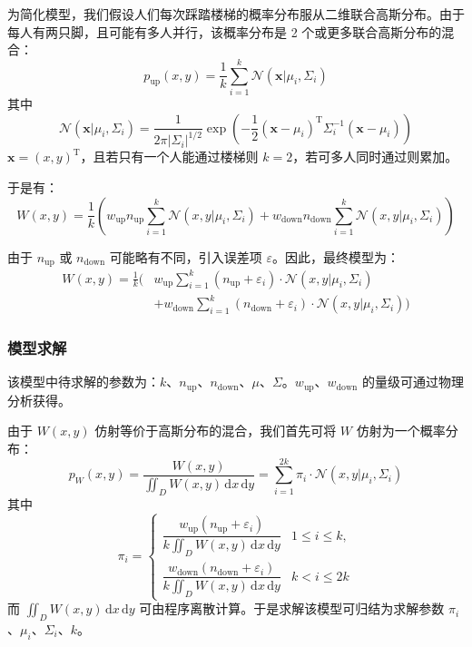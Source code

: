 \documentclass[11pt,a4paper]{ctexart}
\newcommand{\cfgup}{\mathrm{up}}
\newcommand{\cfgdown}{\mathrm{down}}
\begin{document}
为简化模型，我们假设人们每次踩踏楼梯的概率分布服从二维联合高斯分布。由于每人有两只脚，且可能有多人并行，该概率分布是 2 个或更多联合高斯分布的混合：
\begin{equation}
p_{\cfgup}(x,y) = \frac{1}{k}\sum_{i=1}^{k}\mathcal{N}(\mathbf{x}|\mu_i,\Sigma_i)
\end{equation}
其中
\begin{equation}
\mathcal{N}(\mathbf{x}|\mu_i,\Sigma_i) = \frac{1}{2\pi|\Sigma_i|^{1/2}}\exp\left(-\frac{1}{2}(\mathbf{x}-\mu_i)^{\mathrm{T}}\Sigma_i^{-1}(\mathbf{x}-\mu_i)\right)
\end{equation}
$\mathbf{x} = (x,y)^{\mathrm{T}}$，且若只有一个人能通过楼梯则 $k=2$，若可多人同时通过则累加。

于是有：
\begin{equation}
W(x,y) = \frac{1}{k}\left(w_{\cfgup}n_{\cfgup}\sum_{i=1}^{k}\mathcal{N}(x,y|\mu_i,\Sigma_i) + w_{\cfgdown}n_{\cfgdown}\sum_{i=1}^{k}\mathcal{N}(x,y|\mu_i,\Sigma_i)\right)
\end{equation}

由于 $n_{\cfgup}$ 或 $n_{\cfgdown}$ 可能略有不同，引入误差项 $\varepsilon$。因此，最终模型为：
\begin{equation}
\begin{aligned}
W(x,y) = \frac{1}{k}\Bigg(& w_{\cfgup}\sum_{i=1}^{k}(n_{\cfgup}+\varepsilon_i)\cdot\mathcal{N}(x,y|\mu_i,\Sigma_i)\\
&+ w_{\cfgdown}\sum_{i=1}^{k}(n_{\cfgdown}+\varepsilon_i)\cdot\mathcal{N}(x,y|\mu_i,\Sigma_i)\Bigg)
\end{aligned}
\end{equation}

\subsubsection{模型求解}

该模型中待求解的参数为：$k$、$n_{\cfgup}$、$n_{\cfgdown}$、$\mu$、$\Sigma$。$w_{\cfgup}$、$w_{\cfgdown}$ 的量级可通过物理分析获得。

由于 $W(x,y)$ 仿射等价于高斯分布的混合，我们首先可将 $W$ 仿射为一个概率分布：
\begin{equation}
p_W(x,y) = \frac{W(x,y)}{\displaystyle\iint_{D} W(x,y)\,\mathrm{d}x\,\mathrm{d}y} = \sum_{i=1}^{2k}\pi_i\cdot\mathcal{N}(x,y|\mu_i,\Sigma_i)
\end{equation}
其中
\begin{equation}
\pi_i =
\begin{cases}
\dfrac{w_{\cfgup}(n_{\cfgup}+\varepsilon_i)}{k\displaystyle\iint_{D} W(x,y)\,\mathrm{d}x\,\mathrm{d}y} & 1\le i\le k,\\[2.2em]
\dfrac{w_{\cfgdown}(n_{\cfgdown}+\varepsilon_i)}{k\displaystyle\iint_{D} W(x,y)\,\mathrm{d}x\,\mathrm{d}y} & k< i\le 2k
\end{cases}
\end{equation}
而 $\displaystyle\iint_{D} W(x,y)\,\mathrm{d}x\,\mathrm{d}y$ 可由程序离散计算。于是求解该模型可归结为求解参数 $\pi_i$、$\mu_i$、$\Sigma_i$、$k$。
\end{document}
